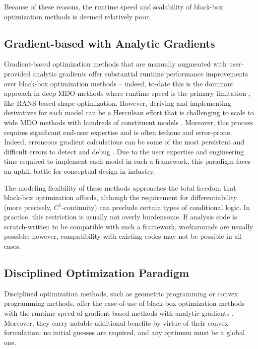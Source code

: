 Because of these reasons, the runtime speed and scalability of black-box optimization methods is deemed relatively poor.

\subsection*{Gradient-based with Analytic Gradients}

Gradient-based optimization methods that are manually augmented with user-provided analytic gradients offer substantial runtime performance improvements over black-box optimization methods -- indeed, to-date this is the dominant approach in deep MDO methods where runtime speed is the primary limitation \cite{martins_coupledadjoint_2005}, like RANS-based shape optimization. However, deriving and implementing derivatives for each model can be a Herculean effort that is challenging to scale to wide MDO methods with hundreds of constituent models \cite{brelje_multidisciplinary_2021}. Moreover, this process requires significant end-user expertise and is often tedious and error-prone. Indeed, erroneous gradient calculations can be some of the most persistent and difficult errors to detect and debug \cite{martins_engineering_2021}. Due to the user expertise and engineering time required to implement each model in such a framework, this paradigm faces an uphill battle for conceptual design in industry.

The modeling flexibility of these methods approaches the total freedom that black-box optimization affords, although the requirement for differentiability (more precisely, $C^1$-continuity) can preclude certain types of conditional logic. In practice, this restriction is usually not overly burdensome. If analysis code is scratch-written to be compatible with such a framework, workarounds are usually possible; however, compatibility with existing codes may not be possible in all cases.

\subsection*{Disciplined Optimization Paradigm}

Disciplined optimization methods, such as geometric programming or convex programming methods, offer the ease-of-use of black-box optimization methods with the runtime speed of gradient-based methods with analytic gradients \cite{gpkit, kirschen}. Moreover, they carry notable additional benefits by virtue of their convex formulation: no initial guesses are required, and any optimum must be a global one.

